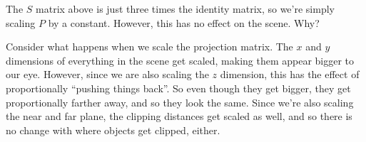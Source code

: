 \documentclass[11pt]{tingpset}
\begin{document}
    The $S$ matrix above is just three times the identity matrix, so we're simply scaling $P$ by a constant. However, this has no effect on the scene. Why?

    Consider what happens when we scale the projection matrix. The $x$ and $y$ dimensions of everything in the scene get scaled, making them appear bigger to our eye. However, since we are also scaling the $z$ dimension, this has the effect of proportionally ``pushing things back''. So even though they get bigger, they get proportionally farther away, and so they look the same. Since we're also scaling the near and far plane, the clipping distances get scaled as well, and so there is no change with where objects get clipped, either.

  \problem


    
  \problem

  \todo

  \problem

  \todo

  \problem

  \todo

  \problem

  \todo
\end{document}

